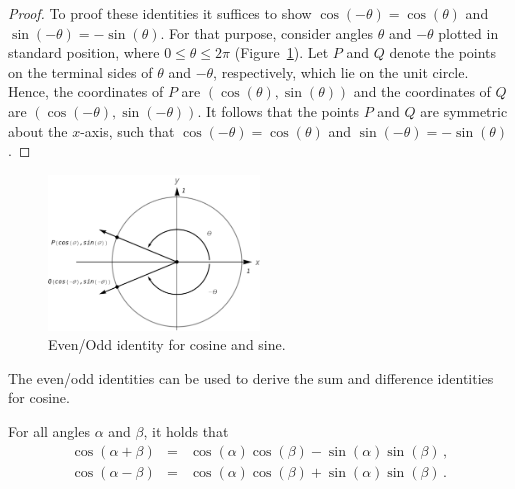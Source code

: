 \begin{proof}
To proof these identities it suffices to show $\cos(-\theta) = \cos(\theta)$ and $\sin(-\theta) = -\sin(\theta)$.  For that purpose, consider angles $\theta$  and $-\theta$ plotted in standard position, where $0\leq\theta\leq 2\pi$ (Figure~\ref{fig_trans_18}). Let $P$ and $Q$ denote the points on the terminal sides of $\theta$ and $-\theta$, respectively, which lie on the unit circle. Hence, the coordinates of $P$ are $(\cos(\theta),\sin(\theta))$ and the coordinates of $Q$ are $(\cos(-\theta),\sin(-\theta))$. It follows that the points $P$ and $Q$ are symmetric about the $x$-axis, such that $\cos(-\theta) = \cos(\theta)$ and $\sin(-\theta) = -\sin(\theta)$. 
\end{proof}

\begin{figure}[h]
	\begin{center}
			\includegraphics[width=0.5\textwidth]{fig_trans_18}
	\caption{Even/Odd identity for cosine and sine. }
	\label{fig_trans_18}
	\end{center}
\end{figure}


\ifvc\pagebreak\fi
The even/odd identities can be used to derive the sum and difference identities for cosine.

\begin{theorem} \label{cosinesumdifference}  
 For all angles $\alpha$ and $\beta$, it holds that
\begin{eqnarray}
\cos(\alpha + \beta) &=& \cos(\alpha) \cos(\beta) - \sin(\alpha) \sin(\beta)\,,\\[0.2cm]
\cos(\alpha - \beta) &=& \cos(\alpha) \cos(\beta) + \sin(\alpha) \sin(\beta)\,.
\end{eqnarray}
\vspace{-0.5cm}
\end{theorem}

